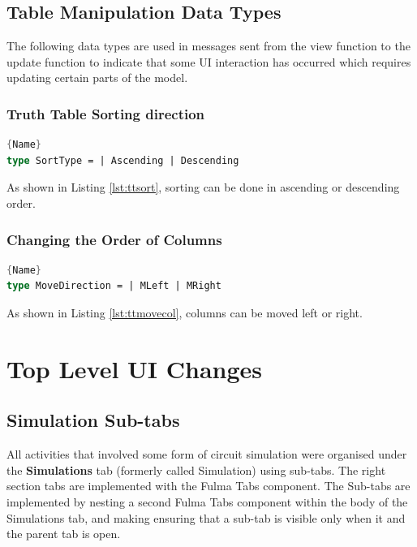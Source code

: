 \subsection{Table Manipulation Data Types}
The following data types are used in messages sent from the view function to the update function to indicate that some UI interaction has occurred which requires updating certain parts of the model.

\subsubsection{Truth Table Sorting direction}
\begin{lstlisting}[caption=Definition for Sort Type,frame=tlrb, language=FSharp, label=lst:ttsort]{Name}
type SortType = | Ascending | Descending
\end{lstlisting} 
As shown in Listing \ref{lst:ttsort}, sorting can be done in ascending or descending order.

\subsubsection{Changing the Order of Columns}
\begin{lstlisting}[caption=Definition for Movement Direction,frame=tlrb, language=FSharp, label=lst:ttmovecol]{Name}
type MoveDirection = | MLeft | MRight
\end{lstlisting} 
As shown in Listing \ref{lst:ttmovecol}, columns can be moved left or right.

\section{Top Level UI Changes}
\subsection{Simulation Sub-tabs}
All activities that involved some form of circuit simulation were organised under the \textbf{Simulations} tab (formerly called Simulation) using sub-tabs. The right section tabs are implemented with the Fulma \cite{fulmaio} Tabs component. The Sub-tabs are implemented by nesting a second Fulma Tabs component within the body of the Simulations tab, and making ensuring that a sub-tab is visible only when it and the parent tab is open.

